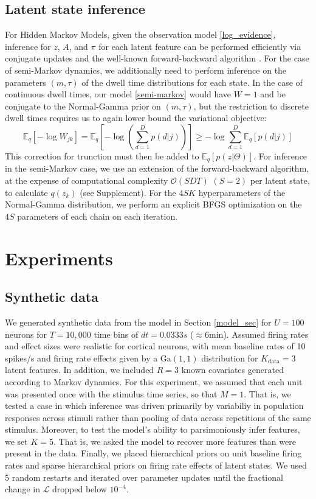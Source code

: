 \documentclass{article} %
\begin{document}
\subsection{Latent state inference}
For Hidden Markov Models, given the observation model \ref{log_evidence}, inference for $z$, $A$, and $\pi$ for each latent feature can be performed efficiently via conjugate updates and the well-known forward-backward algorithm \cite{beal2003variational}. For the case of semi-Markov dynamics, we additionally need to perform inference on the parameters $(m, \tau)$ of the dwell time distributions for each state. In the case of continuous dwell times, our model \ref{semi-markov} would have $W = 1$ and be conjugate to the Normal-Gamma prior on $(m, \tau)$, but the restriction to discrete dwell times requires us to again lower bound the variational objective:
\begin{equation}
    \mathbb{E}_q\left[-\log W_{jk} \right] = 
    \mathbb{E}_q\left[- \log \left( \sum_{d=1}^D p(d|j)\right) \right]
    \ge -\log \sum_{d = 1}^D \mathbb{E}_q\left[p(d|j)\right]
\end{equation}
This correction for trunction must then be added to $\mathbb{E}_q[p(z|\Theta)]$. For inference in the semi-Markov case, we use an extension of the forward-backward algorithm\cite{Yu2006-bb}, at the expense of computational complexity $\mathcal{O}(SDT)$ $(S = 2)$ per latent state, to calculate $q(z_k)$ (see Supplement). For the $4SK$ hyperparameters of the Normal-Gamma distribution, we perform an explicit BFGS optimization on the $4S$ parameters of each chain on each iteration.

\section{Experiments}
\subsection{Synthetic data}
We generated synthetic data from the model in Section \ref{model_sec} for $U=100$ neurons for $T=10,000$ time bins of $dt=0.0333s$ ($\approx 6$min). Assumed firing rates and effect sizes were realistic for cortical neurons, with mean baseline rates of 10 spikes/s and firing rate effects given by a $\text{Ga}(1, 1)$ distribution for $K_{\text{data}}=3$ latent features. In addition, we included $R=3$ known covariates generated according to Markov dynamics. For this experiment, we assumed that each unit was presented once with the stimulus time series, so that $M = 1$. That is, we tested a case in which inference was driven primarily by variabiliy in population responses across stimuli rather than pooling of data across repetitions of the same stimulus. Moreover, to test the model's ability to parsimoniously infer features, we set $K=5$. That is, we asked the model to recover more features than were present in the data. Finally, we placed hierarchical priors on unit baseline firing rates and sparse hierarchical priors on firing rate effects of latent states. We used 5 random restarts and iterated over parameter updates until the fractional change in $\mathcal{L}$ dropped below $10^{-4}$.
\end{document}
